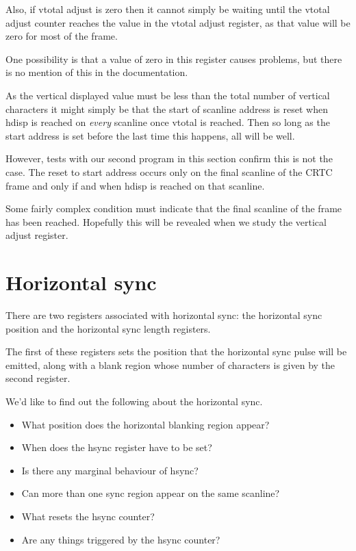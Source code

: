 \documentclass[a4paper,10pt]{amsart}
\begin{document}
Also, if vtotal adjust is zero then it cannot simply be waiting until the
vtotal adjust counter reaches the value in the vtotal adjust register, as that
value will be zero for most of the frame.

One possibility is that a value of zero in this register causes problems, but
there is no mention of this in the documentation.

As the vertical displayed value must be less than the total number of vertical
characters it might simply be that the start of scanline address is reset
when hdisp is reached on \emph{every} scanline once vtotal is reached. Then
so long as the start address is set before the last time this happens, all
will be well.

However, tests with our second program in this section confirm this is not the
case. The reset to start address occurs only on the final scanline of the CRTC
frame and only if and when hdisp is reached on that scanline.

Some fairly complex condition must indicate that the final scanline of the
frame has been reached. Hopefully this will be revealed when we study the
vertical adjust register.

\section{Horizontal sync}

There are two registers associated with horizontal sync: the horizontal sync
position and the horizontal sync length registers.

The first of these registers sets the position that the horizontal sync pulse
will be emitted, along with a blank region whose number of characters is given
by the second register.

We'd like to find out the following about the horizontal sync.

\begin{itemize}
\item What position does the horizontal blanking region appear?
\item When does the hsync register have to be set?
\item Is there any marginal behaviour of hsync?
\item Can more than one sync region appear on the same scanline?
\item What resets the hsync counter?
\item Are any things triggered by the hsync counter?
\end{itemize}
\end{document}
